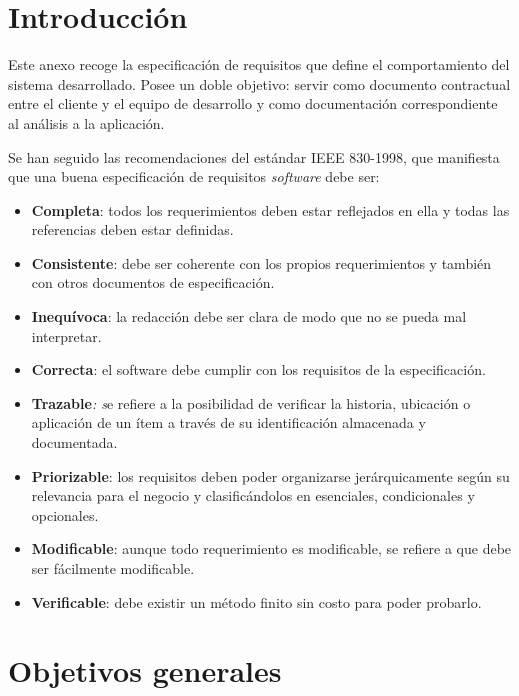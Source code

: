 
\section{Introducción}\label{introduccion-requisitos}

Este anexo recoge la especificación de requisitos que define el
comportamiento del sistema desarrollado. Posee un doble objetivo: servir
como documento contractual entre el cliente y el equipo de desarrollo y
como documentación correspondiente al análisis a la aplicación.

Se han seguido las recomendaciones del estándar IEEE
830-1998, que manifiesta que una buena especificación de requisitos
\emph{software} debe ser: \citep{ieee_830_1998}

\begin{itemize}
\tightlist
\item
  \textbf{Completa}: todos los requerimientos deben estar reflejados en
  ella y todas las referencias deben estar definidas.
\item
  \textbf{Consistente}: debe ser coherente con los propios
  requerimientos y también con otros documentos de especificación.
\item
  \textbf{Inequívoca}: la redacción debe ser clara de modo que no se
  pueda mal interpretar.
\item
  \textbf{Correcta}: el software debe cumplir con los requisitos de la
  especificación.
\item
  \textbf{Trazable}\emph{: s}e refiere a la posibilidad de verificar la
  historia, ubicación o aplicación de un ítem a través de su
  identificación almacenada y documentada.
\item
  \textbf{Priorizable}: los requisitos deben poder organizarse
  jerárquicamente según su relevancia para el negocio y clasificándolos
  en esenciales, condicionales y opcionales.
\item
  \textbf{Modificable}: aunque todo requerimiento es modificable, se
  refiere a que debe ser fácilmente modificable.
\item
  \textbf{Verificable}: debe existir un método finito sin costo para
  poder probarlo.
\end{itemize}

\section{Objetivos generales}\label{objetivos-generales}

